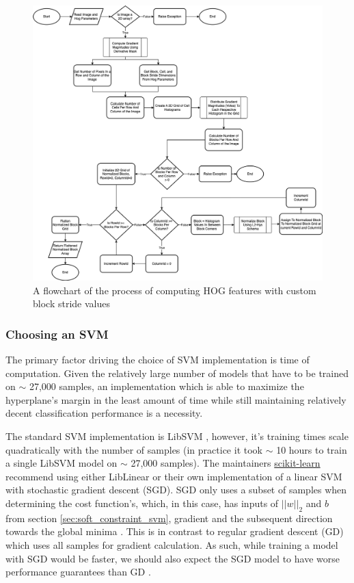 \begin{figure}
    \centering
    \includegraphics[width=0.85\linewidth]{images/ee_hog.drawio.png}
    \caption{A flowchart of the process of computing HOG features with custom block stride values}
    \label{fig:hog_flowchart}
\end{figure}

\subsubsection{Choosing an SVM}

The primary factor driving the choice of SVM implementation is time of computation. Given the relatively large number of models that have to be trained on $\sim$ 27,000 samples, an implementation which is able to maximize the hyperplane's margin in the least amount of time while still maintaining relatively decent classification performance is a necessity. 

The standard SVM implementation is LibSVM \cite{chang_lin_2011_libsvm} \cite{scikit-learn_svm}, however, it's training times scale quadratically with the number of samples \cite{scikit-learn_svm} (in practice it took $\sim$ 10 hours to train a single LibSVM model on $\sim$ 27,000 samples). The maintainers \href{https://scikit-learn.org/}{scikit-learn} recommend using either LibLinear or their own implementation of a linear SVM with stochastic gradient descent (SGD). SGD only uses a subset of samples when determining the cost function's, which, in this case, has inputs of $||w||_{2}$ and $b$ from section \ref{sec:soft_constraint_svm}, gradient and the subsequent direction towards the global minima \cite{uc_berkeley_sgd}. This is in contrast to regular gradient descent (GD) which uses all samples for gradient calculation. As such, while training a model with SGD would be faster, we should also expect the SGD model to have worse performance guarantees than GD \cite{uc_berkeley_sgd}.

